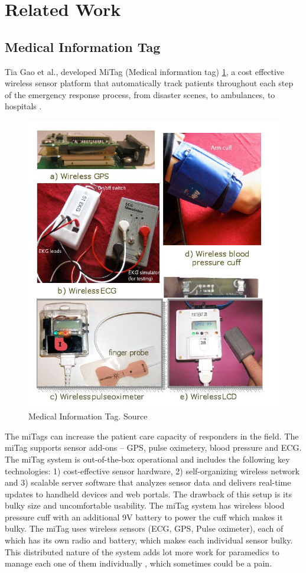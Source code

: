 \section{Related Work}

\subsection{Medical Information Tag}
Tia Gao et al., developed MiTag (Medical information tag) \ref{fig:miTag}, a cost effective 
wireless sensor platform that automatically track patients 
throughout each step of the emergency response process, from disaster 
scenes, to ambulances, to hospitals \cite{miTag}.
\begin{figure}[h]
	\centering
	\includegraphics[scale = 0.6 ]{miTag.JPG}
	\caption{Medical Information Tag. Source \cite{miTag}\label{fig:miTag}}
\end{figure}
The miTags can increase 
the patient care capacity of responders in the field. The miTag  supports sensor add-ons – GPS, pulse oximetery, blood pressure and ECG. 
The miTag system is out-of-the-box operational and includes the following key technologies: 1) cost-effective sensor hardware, 2) 
self-organizing wireless network and 3) scalable server software 
that analyzes sensor data and delivers real-time updates to 
handheld devices and web portals. The drawback of this setup is its bulky size and uncomfortable usability. The miTag system has wireless blood pressure cuff with an additional 9V battery to power the cuff which makes it bulky. The miTag uses wireless sensors (ECG, GPS, Pulse oximeter), each of which has its own radio and battery, which makes each individual sensor bulky. This distributed nature of the system adds lot more work for paramedics to manage each one of them individually , which sometimes could be a pain. 
